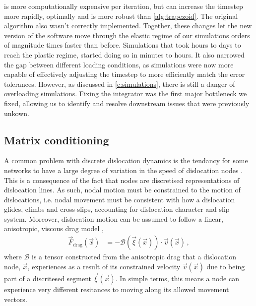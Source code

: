  is more computationally expensive per iteration, but can increase the timestep more rapidly, optimally and is more robust than \cref{alg:trapezoid}. The original algorithm also wasn't correctly implemented. Together, these changes let the new version of the software move through the elastic regime of our simulations orders of magnitude times faster than before. Simulations that took hours to days to reach the plastic regime, started doing so in minutes to hours. It also narrowed the gap between different loading conditions, as simulations were now more capable of effectively adjusting the timestep to more efficiently match the error tolerances. However, as discussed in \cref{c:simulations}, there is still a danger of overloading simulations. Fixing the integrator was the first major bottleneck we fixed, allowing us to identify and resolve downstream issues that were previously unkown.

\subsection{Matrix conditioning}
\label{ss:matrix}

A common problem with discrete dislocation dynamics is the tendancy for some networks to have a large degree of variation in the speed of dislocation nodes \cite{bertin2019gpu,ddlab,arsenlis2007enabling}. This is a consequence of the fact that nodes are discretised representations of dislocation lines. As such, nodal motion must be constrained to the motion of dislocations, i.e. nodal movement must be consistent with how a dislocation glides, climbs and cross-slips, accounting for dislocation character and slip system. Moreover, dislocation motion can be assumed to follow a linear, anisotropic, viscous drag model \cite{ddlab},
\begin{align}\label{eq:dragCoef}
    \vec{F}_\textrm{drag}(\vec{x}) & = -\mathcal{B}(\vec{\xi}(\vec{x})) \cdot \vec{v}(\vec{x})\,,
\end{align}
where $\mathcal{B}$ is a tensor constructed from the anisotropic drag that a dislocation node, $\vec{x}$, experiences as a result of its constrained velocity $\vec{v}(\vec{x})$ due to being part of a discritesed segment $\vec{\xi}(\vec{x})$. In simple terms, this means a node can experience very different resitances to moving along its allowed movement vectors.

